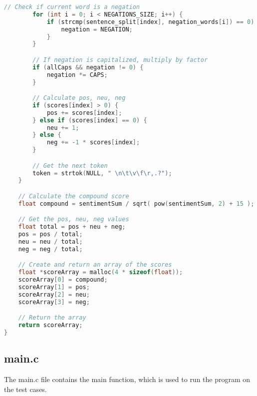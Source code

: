 \documentclass[12pt]{article}
\begin{document}
\begin{lstlisting}[basicstyle=\tiny, language=c]
		// Check if current word is a negation
		for (int i = 0; i < NEGATIONS_SIZE; i++) {
			if (strcmp(sentence_split[index], negation_words[i]) == 0) {
				negation = NEGATION;
			}
		}

		// If negation is capitalized, multiply by factor
		if (allCaps && negation != 0) {
			negation *= CAPS;
		}

		// Calculate pos, neu, neg
		if (scores[index] > 0) {
			pos += scores[index];
		} else if (scores[index] == 0) {
			neu += 1;
		} else {
			neg += -1 * scores[index];
		}

		// Get the next token
        token = strtok(NULL, " \n\t\v\f\r,.?");
	}

	// Calculate the compound score
	float compound = sentimentSum / sqrt( pow(sentimentSum, 2) + 15 );

	// Get the pos, neu, neg values
	float total = pos + neu + neg;
	pos = pos / total;
	neu = neu / total;
	neg = neg / total;

	// Create and return an array of the scores
	float *scoreArray = malloc(4 * sizeof(float));
	scoreArray[0] = compound;
	scoreArray[1] = pos;
	scoreArray[2] = neu;
	scoreArray[3] = neg;

	// Return the array
	return scoreArray;
}
\end{lstlisting}

\subsection{main.c}

The main.c file contains the main function, which is used to run the program on the test cases.
\end{document}
